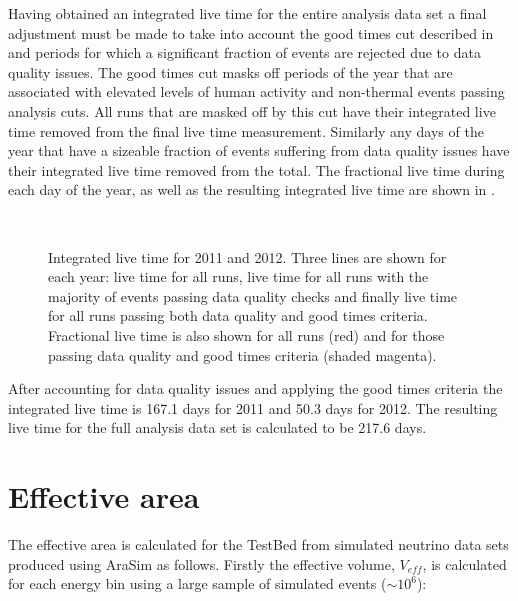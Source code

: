 Having obtained an integrated live time for the entire analysis data set a final adjustment must be made to take into account the good times cut described in  and periods for which a significant fraction of events are rejected due to data quality issues. The good times cut masks off periods of the year that are associated with elevated levels of human activity and non-thermal events passing analysis cuts. All runs that are masked off by this cut have their integrated live time removed from the final live time measurement. Similarly any days of the year that have a sizeable fraction of events suffering from data quality issues have their integrated live time removed from the total. The fractional live time during each day of the year, as well as the resulting integrated live time are shown in . 

\begin{figure}
  \hfill
  \\
  \hfill
  \caption{Integrated live time for 2011 and 2012. Three lines are shown for each year: live time for all runs, live time for all runs with the majority of events passing data quality checks and finally live time for all runs passing both data quality and good times criteria. Fractional live time is also shown for all runs (red) and for those passing data quality and good times criteria (shaded magenta).}
  \label{fig:Results:Integrated-LiveTime}
\end{figure}

After accounting for data quality issues and applying the good times criteria the integrated live time is 167.1 days for 2011 and 50.3 days for 2012. The resulting live time for the full analysis data set is calculated to be 217.6 days.


\section{Effective area}
\label{sec:Results:Effective-Area}

The effective area is calculated for the TestBed from simulated neutrino data sets produced using AraSim as follows. Firstly the effective volume, $V_{eff}$, is calculated for each energy bin using a large sample of simulated events ($\sim 10^{6}$):

